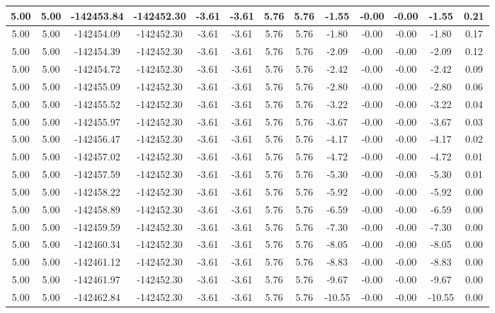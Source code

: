 \begin{table}[htbp]
\begin{adjustbox}{angle=90}
\begin{tabular}{|c|c|c|c|c|c|c|c|c|c|c|c|c|}
 5.00 & 5.00 & -142453.84 & -142452.30 & -3.61 & -3.61 & 5.76 & 5.76 & -1.55 & -0.00 & -0.00 & -1.55 & 0.21\\ \hline
 5.00 & 5.00 & -142454.09 & -142452.30 & -3.61 & -3.61 & 5.76 & 5.76 & -1.80 & -0.00 & -0.00 & -1.80 & 0.17\\ \hline
 5.00 & 5.00 & -142454.39 & -142452.30 & -3.61 & -3.61 & 5.76 & 5.76 & -2.09 & -0.00 & -0.00 & -2.09 & 0.12\\ \hline
 5.00 & 5.00 & -142454.72 & -142452.30 & -3.61 & -3.61 & 5.76 & 5.76 & -2.42 & -0.00 & -0.00 & -2.42 & 0.09\\ \hline
 5.00 & 5.00 & -142455.09 & -142452.30 & -3.61 & -3.61 & 5.76 & 5.76 & -2.80 & -0.00 & -0.00 & -2.80 & 0.06\\ \hline
 5.00 & 5.00 & -142455.52 & -142452.30 & -3.61 & -3.61 & 5.76 & 5.76 & -3.22 & -0.00 & -0.00 & -3.22 & 0.04\\ \hline
 5.00 & 5.00 & -142455.97 & -142452.30 & -3.61 & -3.61 & 5.76 & 5.76 & -3.67 & -0.00 & -0.00 & -3.67 & 0.03\\ \hline
 5.00 & 5.00 & -142456.47 & -142452.30 & -3.61 & -3.61 & 5.76 & 5.76 & -4.17 & -0.00 & -0.00 & -4.17 & 0.02\\ \hline
 5.00 & 5.00 & -142457.02 & -142452.30 & -3.61 & -3.61 & 5.76 & 5.76 & -4.72 & -0.00 & -0.00 & -4.72 & 0.01\\ \hline
 5.00 & 5.00 & -142457.59 & -142452.30 & -3.61 & -3.61 & 5.76 & 5.76 & -5.30 & -0.00 & -0.00 & -5.30 & 0.01\\ \hline
 5.00 & 5.00 & -142458.22 & -142452.30 & -3.61 & -3.61 & 5.76 & 5.76 & -5.92 & -0.00 & -0.00 & -5.92 & 0.00\\ \hline
 5.00 & 5.00 & -142458.89 & -142452.30 & -3.61 & -3.61 & 5.76 & 5.76 & -6.59 & -0.00 & -0.00 & -6.59 & 0.00\\ \hline
 5.00 & 5.00 & -142459.59 & -142452.30 & -3.61 & -3.61 & 5.76 & 5.76 & -7.30 & -0.00 & -0.00 & -7.30 & 0.00\\ \hline
 5.00 & 5.00 & -142460.34 & -142452.30 & -3.61 & -3.61 & 5.76 & 5.76 & -8.05 & -0.00 & -0.00 & -8.05 & 0.00\\ \hline
 5.00 & 5.00 & -142461.12 & -142452.30 & -3.61 & -3.61 & 5.76 & 5.76 & -8.83 & -0.00 & -0.00 & -8.83 & 0.00\\ \hline
 5.00 & 5.00 & -142461.97 & -142452.30 & -3.61 & -3.61 & 5.76 & 5.76 & -9.67 & -0.00 & -0.00 & -9.67 & 0.00\\ \hline
 5.00 & 5.00 & -142462.84 & -142452.30 & -3.61 & -3.61 & 5.76 & 5.76 & -10.55 & -0.00 & -0.00 & -10.55 & 0.00\\ \hline

\end{tabular}
\end{adjustbox}
\end{table}
